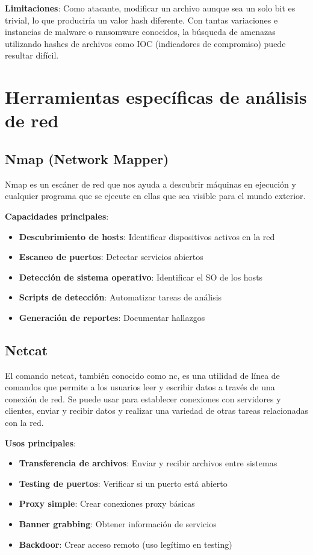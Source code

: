 \textbf{Limitaciones}: Como atacante, modificar un archivo aunque sea un solo bit es trivial, lo que produciría un valor hash diferente. Con tantas variaciones e instancias de malware o ransomware conocidos, la búsqueda de amenazas utilizando hashes de archivos como IOC (indicadores de compromiso) puede resultar difícil.

\section{Herramientas específicas de análisis de red}

\subsection{Nmap (Network Mapper)}

Nmap es un escáner de red que nos ayuda a descubrir máquinas en ejecución y cualquier programa que se ejecute en ellas que sea visible para el mundo exterior.

\textbf{Capacidades principales}:
\begin{itemize}
    \item \textbf{Descubrimiento de hosts}: Identificar dispositivos activos en la red
    \item \textbf{Escaneo de puertos}: Detectar servicios abiertos
    \item \textbf{Detección de sistema operativo}: Identificar el SO de los hosts
    \item \textbf{Scripts de detección}: Automatizar tareas de análisis
    \item \textbf{Generación de reportes}: Documentar hallazgos
\end{itemize}

\subsection{Netcat}

El comando netcat, también conocido como nc, es una utilidad de línea de comandos que permite a los usuarios leer y escribir datos a través de una conexión de red. Se puede usar para establecer conexiones con servidores y clientes, enviar y recibir datos y realizar una variedad de otras tareas relacionadas con la red.

\textbf{Usos principales}:
\begin{itemize}
    \item \textbf{Transferencia de archivos}: Enviar y recibir archivos entre sistemas
    \item \textbf{Testing de puertos}: Verificar si un puerto está abierto
    \item \textbf{Proxy simple}: Crear conexiones proxy básicas
    \item \textbf{Banner grabbing}: Obtener información de servicios
    \item \textbf{Backdoor}: Crear acceso remoto (uso legítimo en testing)
\end{itemize}

